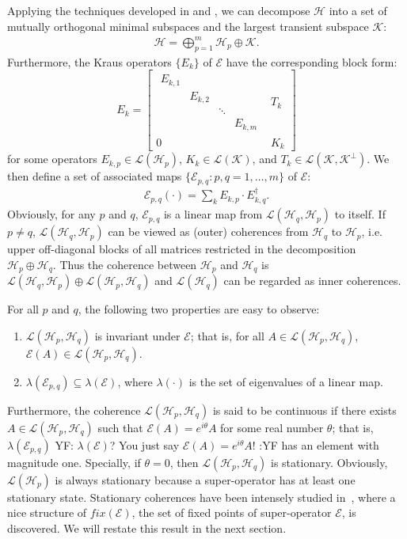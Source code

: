 \documentclass[journal]{IEEEtran}
\def\h{\ensuremath{\mathcal{H}}}
\def\l{\ensuremath{\mathcal{L}}}
\def\k{\ensuremath{\mathcal{K}}}
\def\e{\ensuremath{\mathcal{E}}}
\def\l{\ensuremath{\mathcal{L}}}
\def\l{\mathcal{L}}
\def\k{\mathcal{K}}
\newcommand{\authorComment}[3]{\color{#1}#2: {#3} :#2\color{black}}
\newcommand{\yf}[1]{\authorComment{blue}{YF}{#1}}
\begin{document}
Applying the techniques developed in \cite{ying2013reachability} and \cite{baumgartner2012structure}, we can decompose $\h$ into a set of mutually orthogonal minimal subspaces and the largest transient subspace $\k$: 
\begin{eqnarray}\label{eq_mini_dec}
  \h=\bigoplus_{p=1}^m\h_p\oplus\k.
\end{eqnarray}
Furthermore, the Kraus operators $\{E_k\}$ of $\e$ have the  corresponding block form:
$$\renewcommand{\arraystretch}{1.2}
E_k=\left[\begin{array}{c|c}
  \begin{array}{cccc}
  E_{k,1} & & &\\
  & E_{k,2}  & &\\
  & & \ddots &\\
  & & & E_{k,m}  
  \end{array} & T_k\\
  \hline
0&K_k
\end{array}\right]$$
 for some operators $E_{k,p}\in \l(\h_p)$, $K_k\in \l(\k)$, and $T_k\in \l(\k,\k^{\perp}).$
We then define a set of associated maps $\{\e_{p,q} : p,q = 1, \dots, m\}$ of $\e$:
\begin{eqnarray}\label{Eq_ass_maps}
  \e_{p,q}(\cdot)=\sum_{k} E_{k,p}\cdot E_{k,q}^\dagger.
\end{eqnarray}
Obviously, for any $p$ and $q$, $\e_{p,q}$ is a linear  map from $\l(\h_q,\h_p)$ to itself. If $p\not =q$, $\l(\h_q, \h_p)$ can  be viewed as (outer) coherences from  $\h_q$ to $\h_p$, i.e.  upper off-diagonal blocks of all matrices restricted in the decomposition $\h_p\oplus\h_q.$ Thus the coherence between $\h_p$ and $\h_q$ is  $\l(\h_q, \h_p)\oplus\l(\h_p, \h_q)$ and $\l(\h_q)$ can be regarded as inner coherences.

For all $p$ and $q$, the following two properties are easy to observe:
\begin{enumerate}
\item $\l(\h_p,\h_q)$ is invariant under $\e$; that is, for all $A\in \l(\h_p,\h_q)$, $\e(A)\in \l(\h_p,\h_q)$.
\item  $\lambda(\e_{p,q})\subseteq \lambda(\e)$, where $\lambda(\cdot)$ is the set of eigenvalues of a linear map.
\end{enumerate}
Furthermore,  the coherence $\l(\h_p,\h_q)$ is said to be continuous if there exists $A\in \l(\h_p,\h_q)$ such that $\e(A)=e^{i\theta}A$ for some real number $\theta$; that is, $\lambda(\e_{p,q})$ \yf{$\lambda(\e)$? You just say $\e(A)=e^{i\theta}A$!} has an element with magnitude one.  Specially, if $\theta=0$, then $\l(\h_p,\h_q)$ is stationary. Obviously, $\l(\h_p)$ is always stationary because a super-operator has at least one stationary state. Stationary coherences have been intensely studied in~\cite{baumgartner2012structure}, where a nice structure of $fix(\e)$, the set of fixed points of super-operator $\e$, is discovered. We will restate this result in the next section.
\end{document}
